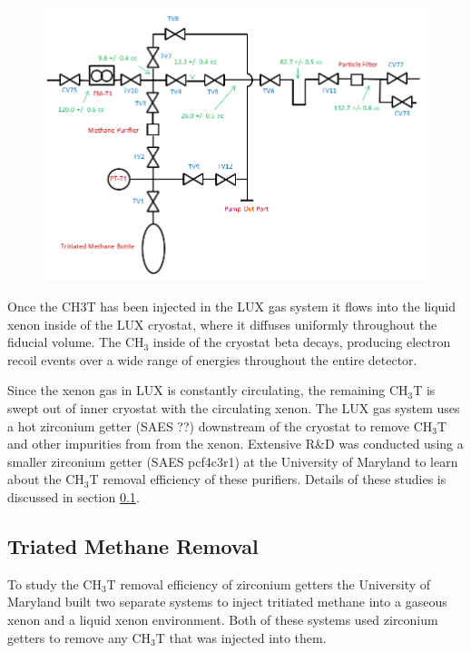 \documentclass[a4paper,12pt]{article}
\begin{document}
{\begin{figure} [!h]
\includegraphics[scale=.6]{TritiumPlumbing.png} 
\label{LUXInjectionSys}
\end{figure}

Once the CH3T has been injected in the LUX gas system it flows into the liquid xenon
inside of the LUX cryostat, where it diffuses uniformly throughout the fiducial volume.  The CH$_3$ inside of the cryostat beta decays, producing electron recoil events over a wide range of energies throughout the entire detector.  

Since the xenon gas in LUX is constantly circulating, the remaining CH$_3$T is swept out of inner cryostat with the circulating xenon.  The LUX gas system uses a hot zirconium getter (SAES ??) downstream of the cryostat to remove CH$_3$T and other impurities from from the xenon. Extensive R\&D was conducted using a smaller zirconium getter (SAES pcf4c3r1) at the University of Maryland to learn about the CH$_3$T removal efficiency of these purifiers. Details of these studies is discussed in section \ref{UMDRemoval}.

\subsection{Triated Methane Removal} \label{UMDRemoval}

To study the CH$_3$T removal efficiency of zirconium getters the University of Maryland built two separate systems to inject tritiated methane into a gaseous xenon
and a liquid xenon environment. Both of these systems used zirconium getters to
remove any CH$_3$T that was injected into them.

}
\end{document}
